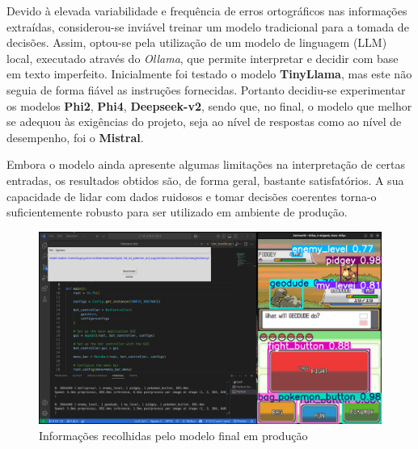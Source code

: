 Devido à elevada variabilidade e frequência de erros ortográficos nas informações extraídas, considerou-se inviável treinar um modelo tradicional para a tomada de decisões. Assim, optou-se pela utilização de um modelo de linguagem (LLM) local, executado através do \textit{Ollama}, que permite interpretar e decidir com base em texto imperfeito. Inicialmente foi testado o modelo \textbf{TinyLlama}, mas este não seguia de forma fiável as instruções fornecidas. Portanto decidiu-se experimentar os modelos \textbf{Phi2}, \textbf{Phi4}, \textbf{Deepseek-v2}, sendo que, no final, o modelo que melhor se adequou às exigências do projeto, seja ao nível de respostas como ao nível de desempenho, foi o \textbf{Mistral}.

Embora o modelo ainda apresente algumas limitações na interpretação de certas entradas, os resultados obtidos são, de forma geral, bastante satisfatórios. A sua capacidade de lidar com dados ruidosos e tomar decisões coerentes torna-o suficientemente robusto para ser utilizado em ambiente de produção.

\begin{figure}[h]
    \centering
    \includegraphics[width=1.0\linewidth]{imagens/informacoes_modelo_final.png}
    \caption{Informações recolhidas pelo modelo final em produção}
    \label{fig:infomacoes_modelo_final}
\end{figure}